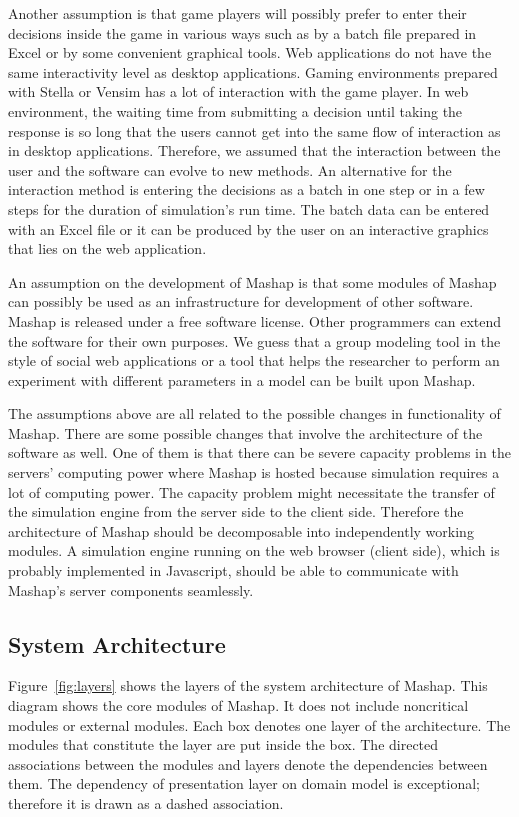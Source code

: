 \documentclass[12pt,a4paper]{paper}
\begin{document}
Another assumption is that game players will possibly prefer to enter their decisions inside the game in various ways such as by a batch file prepared in Excel or by some convenient graphical tools. Web applications do not have the same interactivity level as desktop applications. Gaming environments prepared with Stella or Vensim has a lot of interaction with the game player. In web environment, the waiting time from submitting a decision until taking the response is so long that the users cannot get into the same flow of interaction as in desktop applications. Therefore, we assumed that the interaction between the user and the software can evolve to new methods. An alternative for the interaction method is entering the decisions as a batch in one step or in a few steps for the duration of simulation's run time. The batch data can be entered with an Excel file or it can be produced by the user on an interactive graphics that lies on the web application.

An assumption on the development of Mashap is that some modules of Mashap can possibly be used as an infrastructure for development of other software. Mashap is released under a free software license. Other programmers can extend the software for their own purposes. We guess that a group modeling tool in the style of social web applications or a tool that helps the researcher to perform an experiment with different parameters in a model can be built upon Mashap.

The assumptions above are all related to the possible changes in functionality of Mashap. There are some possible changes that involve the architecture of the software as well. One of them is that there can be severe capacity problems in the servers' computing power where Mashap is hosted because simulation requires a lot of computing power. The capacity problem might necessitate the transfer of the simulation engine from the server side to the client side. Therefore the architecture of Mashap should be decomposable into independently working modules. A simulation engine running on the web browser (client side), which is probably implemented in Javascript, should be able to communicate with Mashap's server components seamlessly.

\subsection{System Architecture}

Figure~\ref{fig:layers} shows the layers of the system architecture of Mashap. This diagram shows the core modules of Mashap. It does not include noncritical modules or external modules. Each box denotes one layer of the architecture. The modules that constitute the layer are put inside the box. The directed associations between the modules and layers denote the dependencies between them. The dependency of presentation layer on domain model is exceptional; therefore it is drawn as a dashed association. \\ 
\end{document}
